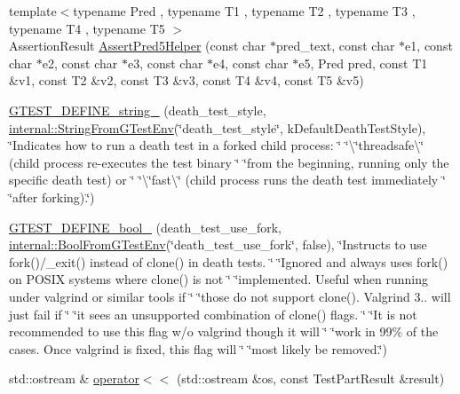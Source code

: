 \begin{DoxyCompactItemize}
\item 
{\footnotesize template$<$typename Pred , typename T1 , typename T2 , typename T3 , typename T4 , typename T5 $>$ }\\Assertion\+Result \mbox{\hyperlink{namespacetesting_addcf52b273ce17269cbf4956cfe600a6}{Assert\+Pred5\+Helper}} (const char $\ast$pred\+\_\+text, const char $\ast$e1, const char $\ast$e2, const char $\ast$e3, const char $\ast$e4, const char $\ast$e5, Pred pred, const T1 \&v1, const T2 \&v2, const T3 \&v3, const T4 \&v4, const T5 \&v5)
\item 
\mbox{\hyperlink{namespacetesting_a62d8ec1eb3e20f20ed52604b0dfa3425}{G\+T\+E\+S\+T\+\_\+\+D\+E\+F\+I\+N\+E\+\_\+string\+\_\+}} (death\+\_\+test\+\_\+style, \mbox{\hyperlink{namespacetesting_1_1internal_a7ed785df46a339403b0f749d3a879201}{internal\+::\+String\+From\+G\+Test\+Env}}(\char`\"{}death\+\_\+test\+\_\+style\char`\"{}, k\+Default\+Death\+Test\+Style), \char`\"{}Indicates how to run a death test in a forked child process\+: \char`\"{} \char`\"{}\textbackslash{}\char`\"{}threadsafe\textbackslash{}\char`\"{} (child process re-\/executes the test binary \char`\"{} \char`\"{}from the beginning, running only the specific death test) or \char`\"{} \char`\"{}\textbackslash{}\char`\"{}fast\textbackslash{}\char`\"{} (child process runs the death test immediately \char`\"{} \char`\"{}after forking).\char`\"{})
\item 
\mbox{\hyperlink{namespacetesting_a428e5944490e497df683cb8324ce4489}{G\+T\+E\+S\+T\+\_\+\+D\+E\+F\+I\+N\+E\+\_\+bool\+\_\+}} (death\+\_\+test\+\_\+use\+\_\+fork, \mbox{\hyperlink{namespacetesting_1_1internal_a67132cdce23fb71b6c38ee34ef81eb4c}{internal\+::\+Bool\+From\+G\+Test\+Env}}(\char`\"{}death\+\_\+test\+\_\+use\+\_\+fork\char`\"{}, false), \char`\"{}Instructs to use fork()/\+\_\+exit() instead of clone() in death tests. \char`\"{} \char`\"{}Ignored and always uses fork() on P\+O\+S\+IX systems where clone() is not \char`\"{} \char`\"{}implemented. Useful when running under valgrind or similar tools if \char`\"{} \char`\"{}those do not support clone(). Valgrind 3.. will just fail if \char`\"{} \char`\"{}it sees an unsupported combination of clone() flags. \char`\"{} \char`\"{}It is not recommended to use this flag w/o valgrind though it will \char`\"{} \char`\"{}work in 99\% of the cases. Once valgrind is fixed, this flag will \char`\"{} \char`\"{}most likely be removed.\char`\"{})
\item 
std\+::ostream \& \mbox{\hyperlink{namespacetesting_a266e39b7c4691fedb856047673a412d8}{operator$<$$<$}} (std\+::ostream \&os, const Test\+Part\+Result \&result)

\end{DoxyCompactItemize}
